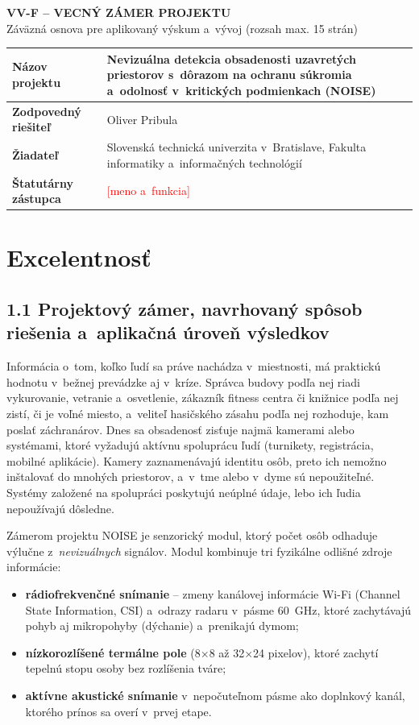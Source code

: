 \documentclass[11pt,a4paper]{article}
\newcommand{\doplnit}[1]{\textcolor{red}{[#1]}}
\begin{document}
\begin{center}
{\Large\bfseries VV-F -- VECNÝ ZÁMER PROJEKTU}\\[3pt]
{\small Záväzná osnova pre aplikovaný výskum a~vývoj (rozsah max. 15 strán)}
\end{center}

\begin{tabularx}{\textwidth}{|p{4.2cm}|L|}
\hline
{}\textbf{Názov projektu} & Nevizuálna detekcia obsadenosti uzavretých priestorov s~dôrazom na ochranu súkromia a~odolnosť v~kritických podmienkach (NOISE) \\ \hline
\textbf{Zodpovedný riešiteľ} & Oliver Pribula \\ \hline
\textbf{Žiadateľ} & Slovenská technická univerzita v~Bratislave, Fakulta informatiky a~informačných technológií \\ \hline
\textbf{Štatutárny zástupca} & \doplnit{meno a~funkcia} \\ \hline
\end{tabularx}

\section{Excelentnosť}

\subsection*{1.1 Projektový zámer, navrhovaný spôsob riešenia a~aplikačná úroveň výsledkov}

Informácia o~tom, koľko ľudí sa práve nachádza v~miestnosti, má praktickú hodnotu v~bežnej prevádzke aj v~kríze. Správca budovy podľa nej riadi vykurovanie, vetranie a~osvetlenie, zákazník fitness centra či knižnice podľa nej zistí, či je voľné miesto, a~veliteľ hasičského zásahu podľa nej rozhoduje, kam poslať záchranárov. Dnes sa obsadenosť zisťuje najmä kamerami alebo systémami, ktoré vyžadujú aktívnu spoluprácu ľudí (turnikety, registrácia, mobilné aplikácie). Kamery zaznamenávajú identitu osôb, preto ich nemožno inštalovať do mnohých priestorov, a~v~tme alebo v~dyme sú nepoužiteľné. Systémy založené na spolupráci poskytujú neúplné údaje, lebo ich ľudia nepoužívajú dôsledne.

Zámerom projektu NOISE je senzorický modul, ktorý počet osôb odhaduje výlučne z~\emph{nevizuálnych} signálov. Modul kombinuje tri fyzikálne odlišné zdroje informácie:
\begin{itemize}
\item \textbf{rádiofrekvenčné snímanie} -- zmeny kanálovej informácie Wi-Fi (Channel State Information, CSI) a~odrazy radaru v~pásme 60~GHz, ktoré zachytávajú pohyb aj mikropohyby (dýchanie) a~prenikajú dymom;
\item \textbf{nízkorozlíšené termálne pole} (8$\times$8 až 32$\times$24 pixelov), ktoré zachytí tepelnú stopu osoby bez rozlíšenia tváre;
\item \textbf{aktívne akustické snímanie} v~nepočuteľnom pásme ako doplnkový kanál, ktorého prínos sa overí v~prvej etape.
\end{itemize}
\end{document}
